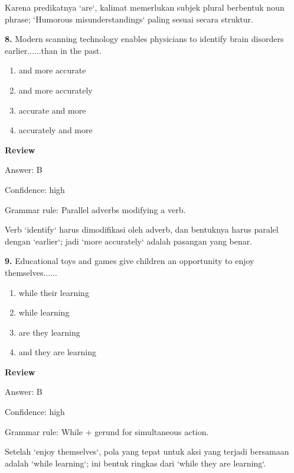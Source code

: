 \documentclass[12pt]{article}
\begin{document}
Karena predikatnya `are`, kalimat memerlukan subjek plural berbentuk noun phrase; `Humorous misunderstandings` paling sesuai secara struktur.\par
\endgroup
\par
\vspace{0.25\baselineskip}
\noindent\textbf{8.} Modern scanning technology enables physicians to identify brain disorders earlier......than in the past.
\begin{enumerate}[label=(\Alph*),leftmargin=*,itemsep=0.2em]
\item and more accurate
\item and more accurately
\item accurate and more
\item accurately and more
\end{enumerate}
\par
\begingroup
\setlength{\parskip}{0pt}
\setlength{\parindent}{0pt}
\textbf{Review}\par
Answer: B\par
Confidence: high\par
Grammar rule: Parallel adverbs modifying a verb.\par
Verb `identify` harus dimodifikasi oleh adverb, dan bentuknya harus paralel dengan `earlier`; jadi `more accurately` adalah pasangan yang benar.\par
\endgroup
\par
\vspace{0.25\baselineskip}
\noindent\textbf{9.} Educational toys and games give children an opportunity to enjoy themselves......
\begin{enumerate}[label=(\Alph*),leftmargin=*,itemsep=0.2em]
\item while their learning
\item while learning
\item are they learning
\item and they are learning
\end{enumerate}
\par
\begingroup
\setlength{\parskip}{0pt}
\setlength{\parindent}{0pt}
\textbf{Review}\par
Answer: B\par
Confidence: high\par
Grammar rule: While + gerund for simultaneous action.\par
Setelah `enjoy themselves`, pola yang tepat untuk aksi yang terjadi bersamaan adalah `while learning`; ini bentuk ringkas dari `while they are learning`.\par
\end{document}
